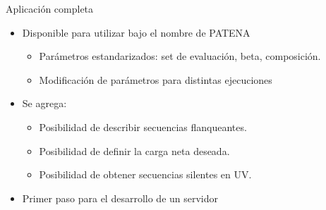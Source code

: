 \documentclass{beamer}
\begin{document}
\begin{frame}{Aplicación completa}
% 
\begin{itemize}
 \item Disponible para utilizar bajo el nombre de PATENA
 \begin{itemize}
	\item Parámetros estandarizados: set de evaluación, beta, composición. 
	\item Modificación de parámetros para distintas ejecuciones %
  \end{itemize}
 \item Se agrega:
 \begin{itemize}
   \item Posibilidad de describir secuencias flanqueantes. 
   \item Posibilidad de definir la carga neta deseada.
   \item Posibilidad de obtener secuencias silentes en UV.
 \end{itemize}
 \item Primer paso para el desarrollo de un servidor 
\end{itemize}

 
\end{frame}
\end{document}
